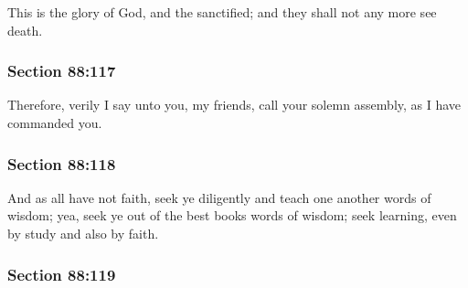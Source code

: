 		This is the glory of God, and the sanctified; and they shall not any more see death.


	\subsubsection{Section 88:117} %
		\label{DC88-117}

		Therefore, verily I say unto you, my friends, call your solemn assembly, as I have commanded you.


	\subsubsection{Section 88:118} %
		\label{DC88-118}

		And as all have not faith, seek ye diligently and teach one another words of wisdom; yea, seek ye out of the best books words of wisdom; seek learning, even by study and also by faith.


	\subsubsection{Section 88:119} %
		\label{DC88-119}

